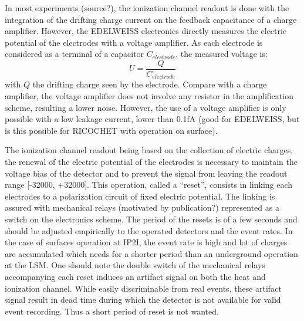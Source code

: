 In most experiments (source?), the ionization channel readout is done with the integration of the drifting charge current on the feedback capacitance of a charge amplifier. However, the EDELWEISS electronics directly measures the electric potential of the electrodes with a voltage amplifier. As each electrode is considered as a terminal of a capacitor $C_{electrode}$, the measured voltage is:
\begin{equation}
U = \frac{Q}{C_{electrode}}
\end{equation}
with $Q$ the drifting charge seen by the electrode.
Compare with a charge amplifier, the voltage amplifier does not involve any resistor in the amplification scheme, resulting a lower noise. However, the use of a voltage amplifier is only possible with a low leakage current, lower than 0.1fA (good for EDELWEISS, but is this possible for RICOCHET with operation on surface).

The ionization channel readout being based on the collection of electric charges, the renewal of the electric potential of the electrodes is necessary to maintain the voltage bias of the detector and to prevent the signal from leaving the readout range [-32000, +32000]. This operation, called a “reset”, consists in linking each electrodes to a polarization circuit of fixed electric potential. The linking is assured with mechanical relays (motivated by publication?) represented as a switch on the electronics scheme. The period of the resets is of a few seconds and should be adjusted empirically to the operated detectors and the event rates. In the case of surfaces operation at IP2I, the event rate is high and lot of charges are accumulated which needs for a shorter period than an underground operation at the LSM.
One should note the double switch of the mechanical relays accompanying each reset induces an artifact signal on both the heat and ionization channel. While easily discriminable from real events, these artifact signal result in dead time during which the detector is not available for valid event recording. Thus a short period of reset is not wanted.

